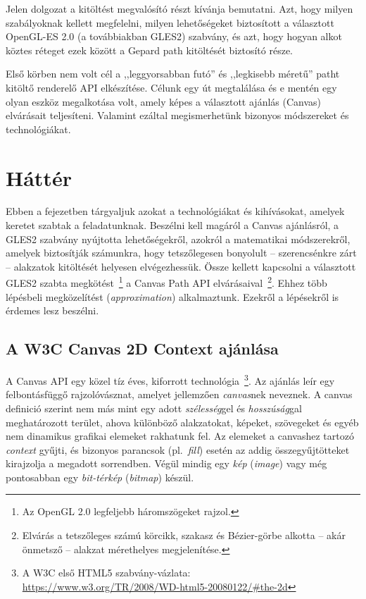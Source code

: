 \documentclass[12pt]{report}
\theoremstyle{definition}
\newcommand{\inenglish}[1]{\textsl{#1}}
\begin{document}
  Jelen dolgozat a kitöltést megvalósító részt kívánja bemutatni.
Azt, hogy milyen szabályoknak kellett megfelelni, milyen lehetőségeket
biztosított a választott OpenGL-ES 2.0 (a továbbiakban GLES2) szabvány, és azt,
hogy hogyan alkot köztes réteget ezek között a Gepard path kitöltését biztosító
része.

  Első körben nem volt cél a ,,leggyorsabban futó'' és ,,legkisebb
méretű'' patht kitöltő renderelő API elkészítése. Célunk egy út megtalálása és
e mentén egy olyan eszköz megalkotása volt, amely képes a választott ajánlás
(Canvas) elvárásait teljesíteni. Valamint ezáltal megismerhetünk bizonyos
módszereket és technológiákat.



    \chapter{Háttér}
    \label{Háttér}

  Ebben a fejezetben tárgyaljuk azokat a technológiákat és kihívásokat,
amelyek keretet szabtak a feladatunknak. Beszélni kell magáról a Canvas
ajánlásról, a GLES2 szabvány nyújtotta lehetőségekről, azokról a matematikai
módszerekről, amelyek biztosítják számunkra, hogy tetszőlegesen bonyolult --
szerencsénkre zárt -- alakzatok kitöltését helyesen elvégezhessük. Össze
kellett kapcsolni a választott GLES2 szabta megkötést~\footnote { Az OpenGL 2.0
legfeljebb háromszögeket rajzol. } a Canvas Path API elvárásaival~\footnote {
Elvárás a tetszőleges számú körcikk, szakasz és Bézier-görbe alkotta -- akár
önmetsző -- alakzat mérethelyes megjelenítése. }. Ehhez több lépésbeli
megközelítést (\inenglish{approximation}) alkalmaztunk. Ezekről a lépésekről is
érdemes lesz beszélni.

    \section[A Canvas ajánlás]{A W3C Canvas 2D Context ajánlása}
    \label{A Canvas ajánlás}

  A Canvas API egy közel tíz éves, kiforrott technológia~\footnote {A W3C első
HTML5 szabvány-vázlata:\\ \footnotesize{
\url{https://www.w3.org/TR/2008/WD-html5-20080122/\#the-2d}} }. Az ajánlás leír
egy felbontásfüggő rajzolóvásznat, amelyet jellemzően \emph{canvas}nek
neveznek. A canvas definició szerint nem más mint egy adott \emph{szélesség}gel
és \emph{hosszúság}gal meghatározott terület, ahova különböző alakzatokat,
képeket, szövegeket és egyéb nem dinamikus grafikai elemeket rakhatunk fel. Az
elemeket a canvashez tartozó \emph{context} gyűjti, és bizonyos parancsok
(pl.~\emph{fill}) esetén az addig összegyűjtötteket kirajzolja a megadott
sorrendben. Végül mindig egy \emph{kép} (\inenglish{image}) vagy még
pontosabban egy \emph{bit-térkép} (\inenglish{bitmap}) készül.
\end{document}
